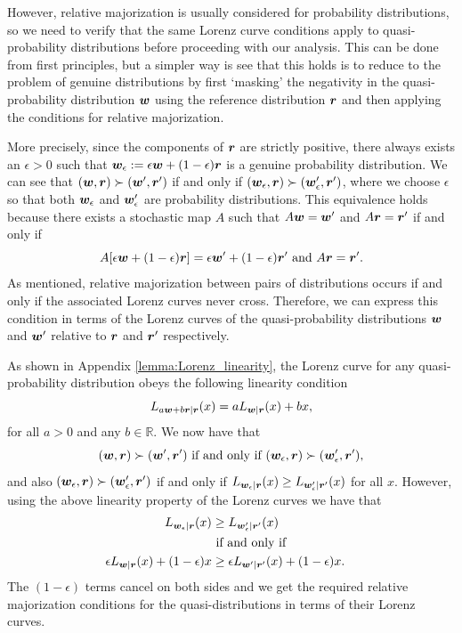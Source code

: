 \documentclass[pra,
aps,
twocolumn,
superscriptaddress,
groupedaddress,
nofootinbib,
reprint
]{revtex4-1}
\begin{document}
However, relative majorization is usually considered for probability distributions, so we need to verify that the same Lorenz curve conditions apply to quasi-probability distributions before proceeding with our analysis. This can be done from first principles, but a simpler way is see that this holds is to reduce to the problem of genuine distributions by first `masking' the negativity in the quasi-probability distribution $\boldsymbol{w}$ using the reference distribution $\boldsymbol{r}$ and then applying the conditions for relative majorization. 
 
More precisely, since the components of $\boldsymbol{r}$ are strictly positive, there always exists an $\epsilon >0$ such that $\boldsymbol{w}_\epsilon := \epsilon \boldsymbol{w} + (1-\epsilon) \boldsymbol{r}$ is a genuine probability distribution. We can see that $(\boldsymbol{w} , \boldsymbol{r}) \succ (\boldsymbol{w}', \boldsymbol{r}')$ if and only if $(\boldsymbol{w}_\epsilon , \boldsymbol{r}) \succ (\boldsymbol{w}_\epsilon', \boldsymbol{r}')$, where we choose $\epsilon$ so that both $\boldsymbol{w}_\epsilon$ and $\boldsymbol{w}_\epsilon'$ are probability distributions. This equivalence holds because there exists a stochastic map $A$ such that $A \boldsymbol{w} = \boldsymbol{w}'$ and $A \boldsymbol{r} = \boldsymbol{r}'$ if and only if 
\begin{equation}
A[\epsilon \boldsymbol{w} + (1-\epsilon) \boldsymbol{r}] = \epsilon \boldsymbol{w}' + (1-\epsilon) \boldsymbol{r}'\mbox{ and } A\boldsymbol{r} = \boldsymbol{r}'.
\end{equation}
As mentioned, relative majorization between pairs of distributions occurs if and only if the associated Lorenz curves never cross. Therefore, we can express this condition in terms of the Lorenz curves of the quasi-probability distributions $\boldsymbol{w}$ and $\boldsymbol{w}'$ relative to $\boldsymbol{r}$ and $\boldsymbol{r}'$ respectively.

As shown in Appendix \ref{lemma:Lorenz_linearity}, the Lorenz curve for any quasi-probability distribution obeys the following linearity condition
\begin{equation}
L_{a \boldsymbol{w} + b \boldsymbol{r} | \boldsymbol{r}} (x) = a L_{\boldsymbol{w}|\boldsymbol{r}} (x) + bx,
\end{equation}
for all $a >0$ and any $b \in \mathbb{R}$. We now have that
\begin{equation}
(\boldsymbol{w}, \boldsymbol{r}) \succ (\boldsymbol{w}', \boldsymbol{r}') \mbox{ if and only if } (\boldsymbol{w}_\epsilon , \boldsymbol{r}) \succ (\boldsymbol{w}_\epsilon', \boldsymbol{r}'),
\end{equation}
and also $(\boldsymbol{w}_\epsilon , \boldsymbol{r}) \succ (\boldsymbol{w}_\epsilon', \boldsymbol{r}')$ if and only if $L_{\boldsymbol{w}_\epsilon |\boldsymbol{r}} (x) \ge L_{\boldsymbol{w}'_\epsilon |\boldsymbol{r}'} (x)$ for all $x$. However, using the above linearity property of the Lorenz curves we have that
\begin{align}
L_{\boldsymbol{w}_\epsilon |\boldsymbol{r}} (x) &\ge L_{\boldsymbol{w}'_\epsilon |\boldsymbol{r}'} (x) \nonumber \\ 
&\mbox{ if and only if }& \nonumber \\
\epsilon L_{\boldsymbol{w} |\boldsymbol{r}} (x) + (1-\epsilon) x &\ge \epsilon L_{\boldsymbol{w}' |\boldsymbol{r}'} (x) + (1-\epsilon) x.
\end{align}
The $(1-\epsilon)$ terms cancel on both sides and we get the required relative majorization conditions for the quasi-distributions in terms of their Lorenz curves.
\end{document}
